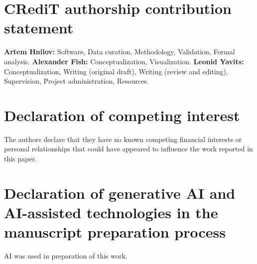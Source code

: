 \documentclass[preprint,review,12pt]{elsarticle}
\begin{document}
\section*{CRediT authorship contribution statement}
\textbf{Artem Hnilov:} Software, Data curation, Methodology, Validation, Formal analysis. \textbf{Alexander Fish:} Conceptualization, Visualization. \textbf{Leonid Yavits:} Conceptualization, Writing (original draft), Writing (review and editing), Supervision, Project administration, Resources.

\section*{Declaration of competing interest}
The authors declare that they have no known competing financial interests or personal relationships that could have appeared to influence the work reported in this paper.

\section*{Declaration of generative AI and AI-assisted technologies in the manuscript preparation process}
AI was used in preparation of this work.



\end{document}
